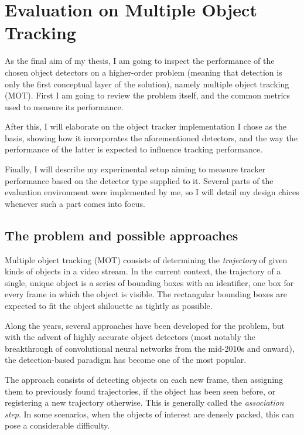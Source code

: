 \chapter{Evaluation on Multiple Object Tracking}

As the final aim of my thesis, I am going to inspect the performance of the chosen object detectors on a higher-order problem (meaning that detection is only the first conceptual layer of the solution), namely multiple object tracking (MOT). First I am going to review the problem itself, and the common metrics used to measure its performance. 

After this, I will elaborate on the object tracker implementation I chose as the basis, showing how it incorporates the aforementioned detectors, and the way the performance of the latter is expected to influence tracking performance.

Finally, I will describe my experimental setup aiming to measure tracker performance based on the detector type supplied to it. Several parts of the evaluation environment were implemented by me, so I will detail my design chices whenever such a part comes into focus.

\section{The problem and possible approaches}

Multiple object tracking (MOT) consists of determining the \textit{trajectory} of given kinds of objects in a video stream. In the current context, the trajectory of a single, unique object is a series of bounding boxes with an identifier, one box for every frame in which the object is visible. The rectangular bounding boxes are expected to fit the object shilouette as tightly as possible.

Along the years, several approaches have been developed for the problem, but with the advent of highly accurate object detectors (most notably the breakthrough of convolutional neural networks from the mid-2010s and onward), the detection-based paradigm has become one of the most popular.

The approach consists of detecting objects on each new frame, then assigning them to previously found trajectories, if the object has been seen before, or registering a new trajectory otherwise. This is generally called the \textit{association step}. In some scenarios, when the objects of interest are densely packed, this can pose a considerable difficulty.

